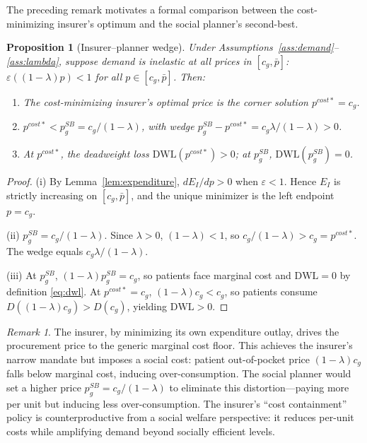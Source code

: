 \documentclass[12pt]{article}
\theoremstyle{plain}
\newtheorem{proposition}{Proposition}
\theoremstyle{definition}
\theoremstyle{remark}
\newtheorem{remark}{Remark}
\newcommand{\pbar}{\bar{p}}
\newcommand{\EI}{E_{I}}
\newcommand{\Pcost}{p^{cost*}}
\newcommand{\1}{\mathbf{1}}
\begin{document}
The preceding remark motivates a formal comparison between the cost-minimizing insurer's optimum and the social planner's second-best.

\begin{proposition}[Insurer--planner wedge]
\label{prop:wedge}
Under Assumptions~\ref{ass:demand}--\ref{ass:lambda}, suppose demand is inelastic at all prices in $[c_g, \pbar]$: $\varepsilon((1-\lambda)p) < 1$ for all $p \in [c_g, \pbar]$. Then:
\begin{enumerate}
\item[(i)] The cost-minimizing insurer's optimal price is the corner solution $\Pcost = c_g$.
\item[(ii)] $\Pcost < p^{SB}_g = c_g/(1-\lambda)$, with wedge $p^{SB}_g - \Pcost = c_g\lambda/(1-\lambda) > 0$.
\item[(iii)] At $\Pcost$, the deadweight loss $\mathrm{DWL}(\Pcost) > 0$; at $p^{SB}_g$, $\mathrm{DWL}(p^{SB}_g) = 0$.
\end{enumerate}
\end{proposition}

\begin{proof}
(i) By Lemma~\ref{lem:expenditure}, $d\EI/dp > 0$ when $\varepsilon < 1$. Hence $\EI$ is strictly increasing on $[c_g, \pbar]$, and the unique minimizer is the left endpoint $p = c_g$.

(ii) $p^{SB}_g = c_g/(1-\lambda)$. Since $\lambda > 0$, $(1-\lambda) < 1$, so $c_g/(1-\lambda) > c_g = \Pcost$. The wedge equals $c_g\lambda/(1-\lambda)$.

(iii) At $p^{SB}_g$, $(1-\lambda)p^{SB}_g = c_g$, so patients face marginal cost and $\mathrm{DWL} = 0$ by definition \eqref{eq:dwl}. At $\Pcost = c_g$, $(1-\lambda)c_g < c_g$, so patients consume $D((1-\lambda)c_g) > D(c_g)$, yielding $\mathrm{DWL} > 0$.
\end{proof}

\begin{remark}
The insurer, by minimizing its own expenditure outlay, drives the procurement price to the generic marginal cost floor. This achieves the insurer's narrow mandate but imposes a social cost: patient out-of-pocket price $(1-\lambda)c_g$ falls below marginal cost, inducing over-consumption. The social planner would set a higher price $p^{SB}_g = c_g/(1-\lambda)$ to eliminate this distortion---paying more per unit but inducing less over-consumption. The insurer's ``cost containment'' policy is counterproductive from a social welfare perspective: it reduces per-unit costs while amplifying demand beyond socially efficient levels.
\end{remark}
\end{document}
